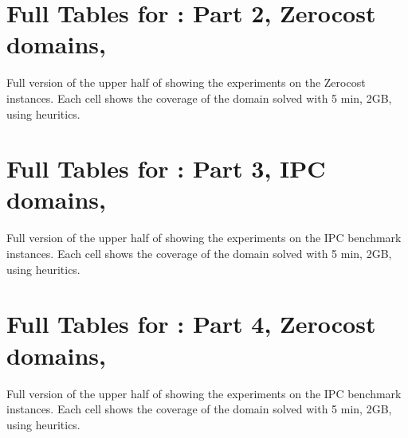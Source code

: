 \documentclass[10pt,letterpaper]{article}
\begin{document}
\newpage
\section{Full Tables for  : Part 2, Zerocost domains, \lmcut}

\begin{table}[htb]
 {
 \centering
 
 \caption{
 Full version of the upper half of  showing 
 the experiments on the Zerocost instances.
 Each cell shows the coverage of the domain solved with 5 min, 2GB,
 using \lmcut heuritics.
 }
 \label{lmcut-zerocost-full}
 }
\end{table}

\newpage
\section{Full Tables for  : Part 3, IPC domains, \mands}

\begin{table}[htb]
 {
 \centering
 
 \caption{
 Full version of the upper half of  showing 
 the experiments on the IPC benchmark instances.
 Each cell shows the coverage of the domain solved with 5 min, 2GB,
 using \mands heuritics.
 }
 \label{mands-ipc-full}
 }
\end{table}

\newpage
\section{Full Tables for  : Part 4, Zerocost domains, \mands}

\begin{table}[htb]
 {
 \centering
 
 \caption{
 Full version of the upper half of  showing 
 the experiments on the IPC benchmark instances.
 Each cell shows the coverage of the domain solved with 5 min, 2GB,
 using \mands heuritics.
 }
 \label{mands-zerocost-full}
 }
\end{table}
\end{document}

